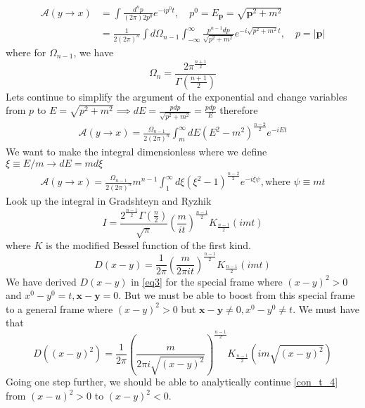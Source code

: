 \begin{align}
    \mathcal{A}(y \to x) & = \int \frac{d^n p}{(2\pi) 2p^0} e^{-ip^0 t}, \quad p^0 = E_{\bm{p}} = \sqrt{\bm{p}^2 +m^2} \nonumber\\
    & = \frac{1}{2(2\pi)^n} \int d\Omega_{n-1} \int_{-\infty}^{\infty} \frac{p^{n-1}dp}{\sqrt{p^2 +m^2}} e^{-i\sqrt{p^2 +m^2}t}, \quad p = |\bm{p}|
\end{align}
where for $\Omega_{n-1}$, we have 
$$\Omega_{n} = \frac{2\pi^{\frac{n+1}{2}}}{\Gamma(\frac{n+1}{2})}$$
Lets continue to simplify the argument of the exponential and change variables from $p$ to $E = \sqrt{p^2 + m^2} \implies dE = \frac{pdp}{\sqrt{p^2 +m^2}} = \frac{pdp}{E}$
therefore 
\begin{align}
    \mathcal{A}(y \to x) = \frac{\Omega_{n -1}}{2(2\pi)^n} \int_{m}^{\infty} dE \left( E^2 - m^2   \right)^{\frac{n-2}{2}} e^{-iEt}
\end{align}
We want to make the integral dimensionless where we define $\xi \equiv E/m \to dE = md\xi$  
\begin{align}
    \mathcal{A} (y \to x) = \frac{\Omega_{n-1}}{2(2\pi)^n} m^{n-1} \int_{1}^{\infty} d\xi \left( \xi^2 - 1 \right)^{\frac{n-2}{2}} e^{-i \xi \psi} , \text{where } \psi \equiv mt
\end{align}
Look up the integral in Gradshteyn and Ryzhik\cite{gradshteyn2014table}
\begin{equation}
    I = \frac{2^{\frac{n-1}{2}} \Gamma(\frac{n}{2})}{\sqrt{\pi}} \left(  \frac{m}{it} \right)^{\frac{n-1}{2}} K_{\frac{n-1}{2}} (i m t )
\end{equation}
where $K$ is the modified Bessel function of the first kind. 
\begin{equation}\label{eq3}
    D(x - y) = \frac{1}{2\pi} \left( \frac{m}{2 \pi it} \right)^{\frac{n-1}{2}} K_{\frac{n-1}{2}} (i m t )
\end{equation}
We have derived $D(x - y)$ in \eqref{eq3} for the special frame where $(x - y)^2 > 0$ and $x^0 - y^0 = t, \bm{x} - \bm{y} = 0$. But we must be able to boost from this special frame to a general frame where $(x - y)^2 > 0$ but $\bm{x} - \bm{y} \neq 0, x^0-  y^0 \neq t$. We must have that
\begin{equation}\label{con_t_4}
     D( (x - y)^2) = \frac{1}{2\pi} \left( \frac{m}{2 \pi i \sqrt{(x - y)^2} } \right)^{\frac{n-1}{2}} K_{\frac{n-1}{2}} (i m \sqrt{(x - y)^2} )
\end{equation}
Going one step further, we should be able to analytically continue \eqref{con_t_4} from $(x - u)^2 > 0$ to $(x - y)^2 <0$.
